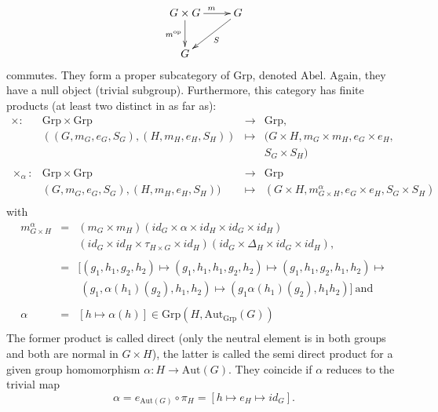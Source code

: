 \begin{enumerate}
$$\xymatrix{
G \times G \ar[d]_{m^{\mathrm{op}}} \ar[r]^{m} &G\ar[ld]^{S}\\
G 
}$$
commutes. They form a proper subcategory of $\mathrm{Grp}$, denoted $\mathrm{Abel}$. Again, they have a null object (trivial subgroup). Furthermore, this category has finite products (at least two distinct in as far as):
$$\begin{array}{rrcl}
\times : &\mathrm{Grp} \times \mathrm{Grp}& \longrightarrow &\mathrm{Grp},\\ &\left((G, m_G, e_G, S_G), (H, m_H, e_H, S_H)\right)& \longmapsto &(G \times H, m_{G} \times m_H, e_{G} \times e_{H},\\
&&& S_G \times S_H)\\
&&&\\
\times_{\alpha} : &\mathrm{Grp} \times \mathrm{Grp} &\longrightarrow& \mathrm{Grp}\\
&(G,m_G,e_G,S_G),(H,m_H,e_H,S_H))&\longmapsto&(G \times H, m^{\alpha}_{G \times H}, e_G \times e_H, S_{G} \times S_{H})\\
\end{array}$$
with
$$\begin{array}{rcl}
m^\alpha_{G \times H} &=& (m_G \times m_H) (id_G \times \alpha \times id_H \times id_G \times id_H)\\&&(id_G \times id_H \times \tau_{H\times G}\times id_H)(id_G \times \Delta_H \times id_G \times id_H),\\
&&\\
&=& [(g_1,h_1,g_2,h_2) \longmapsto (g_1,h_1,h_1,g_2,h_2) \longmapsto (g_1,h_1,g_2,h_1,h_2) \longmapsto\\&&~ (g_1, \alpha(h_1)(g_2),h_1,h_2) \longmapsto (g_1 \alpha(h_1)(g_2), h_1 h_2)] \ \mathrm{and}\\
&&\\
\alpha &=& [h \longmapsto \alpha(h)] \in \mathrm{Grp}(H,\mathrm{Aut}_{\mathrm{Grp}}(G))\\
\end{array}$$
The former product is called direct (only the neutral element is in both groups and both are normal in $G \times H$), the latter is called the semi direct product for a given group homomorphism $\alpha : H \longrightarrow \mathrm{Aut}(G)$. They coincide if $\alpha$ reduces to the trivial map
$$\alpha = e_{\mathrm{Aut}(G)} \circ \pi_H = [ h \longmapsto e_H \longmapsto id_G].$$
\end{enumerate}
